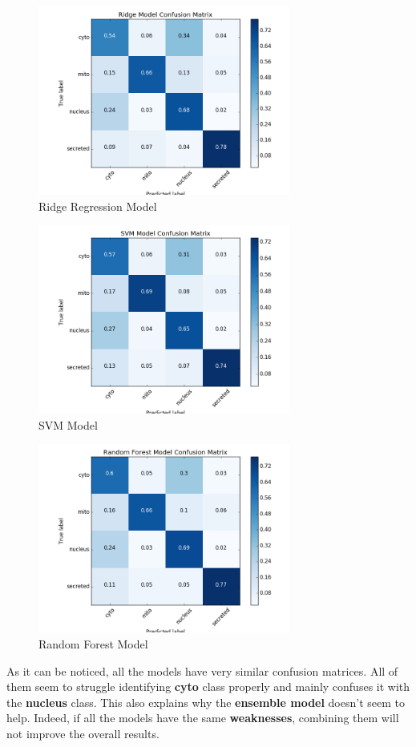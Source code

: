 \documentclass{bioinfo}
\begin{document}
\begin{methods}
\begin{figure}[H]%
\centerline{\includegraphics[width=235pt]{Ridge_cc.png}}
\caption{Ridge Regression Model}\label{fig:02}
\end{figure}

\begin{figure}[H]%
\centerline{\includegraphics[width=235pt]{SVM_cc.png}}
\caption{SVM Model}\label{fig:03}
\end{figure}


\begin{figure}[H]%
\centerline{\includegraphics[width=235pt]{RF_cc.png}}
\caption{Random Forest Model}\label{fig:04}
\end{figure}


As it can be noticed, all the models have very similar confusion matrices. All of them seem to struggle identifying \textbf{cyto} class properly and mainly confuses it with the \textbf{nucleus} class. This also explains why the \textbf{ensemble model} doesn't seem to help. Indeed, if all the models have the same \textbf{weaknesses}, combining them will not improve the overall results. \\


\end{methods}
\end{document}

